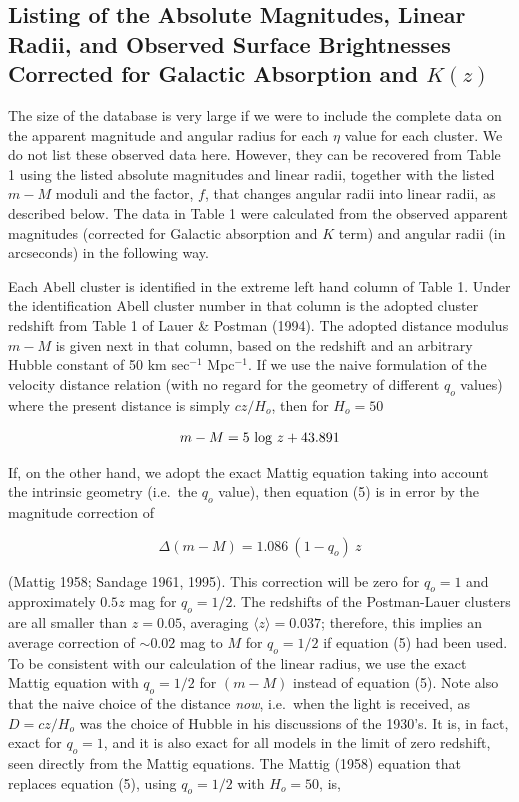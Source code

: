 \documentclass[preprint]{aastex}
\begin{document}
\subsection{Listing of the Absolute Magnitudes, Linear Radii, and Observed Surface Brightnesses Corrected for Galactic Absorption and $K(z)$}

The size of the database is very large if we were to include the
complete data on the apparent magnitude and angular radius for each
$\eta$ value for each cluster. We do not list these observed data
here. However, they can be recovered from Table 1 using the listed
absolute magnitudes and linear radii, together with the listed $m - M$
moduli and the factor, $f$, that changes angular radii into linear
radii, as described below. The data in Table 1 were calculated from
the observed apparent magnitudes (corrected for Galactic absorption
and $K$ term) and angular radii (in arcseconds) in the following way.

Each Abell cluster is identified in the extreme left hand column of
Table 1. Under the identification Abell cluster number in that column
is the adopted cluster redshift from Table 1 of Lauer \& Postman
(1994). The adopted distance modulus $m - M$ is given next in that
column, based on the redshift and an arbitrary Hubble constant of 50
km sec$^{-1}$ Mpc$^{-1}$. If we use the naive formulation of the
velocity distance relation (with no regard for the geometry of
different $q_o$ values) where the present distance is simply $cz/H_o$,
then for $H_o = 50$

\begin{equation}
            m - M = 5~{\rm log}~z + 43.891
\end{equation}

\noindent If, on the other hand, we adopt the exact Mattig equation
taking into account the intrinsic geometry (i.e.\ the $q_o$ value),
then equation (5) is in error by the magnitude correction of

\begin{equation}
             \Delta (m - M) =  1.086~(1-q_o)~z
\end{equation}

\noindent (Mattig 1958; Sandage 1961, 1995). This correction will be
zero for $q_o = 1$ and approximately $0.5z$ mag for $q_o = 1/2$. The
redshifts of the Postman-Lauer clusters are all smaller than $z =
0.05$, averaging $\langle z \rangle = 0.037$; therefore, this implies
an average correction of $\sim 0.02$ mag to $M$ for $q_o = 1/2$ if
equation (5) had been used.  To be consistent with our calculation of
the linear radius, we use the exact Mattig equation with $q_o = 1/2$
for $(m - M)$ instead of equation (5). Note also that the naive choice
of the distance {\it now}, i.e.\ when the light is received, as $D =
cz/H_o$ was the choice of Hubble in his discussions of the 1930's. It
is, in fact, exact for $q_o = 1$, and it is also exact for all models
in the limit of zero redshift, seen directly from the Mattig
equations.  The Mattig (1958) equation that replaces equation (5),
using $q_o = 1/2$ with $H_o = 50$, is,
\end{document}
